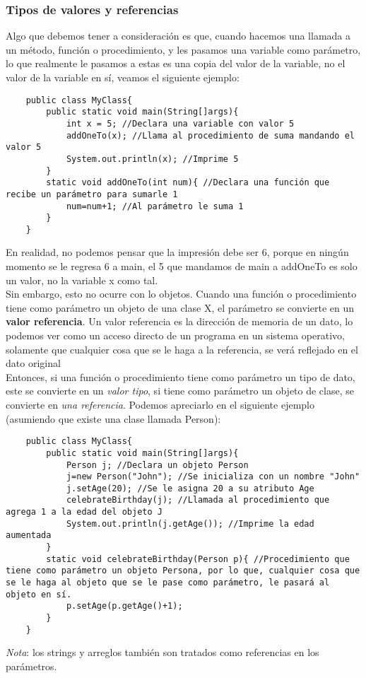 \subsubsection{Tipos de valores y referencias}
Algo que debemos tener a consideración es que, cuando hacemos una llamada a un método, función o procedimiento, y les pasamos una variable como parámetro, lo que realmente le pasamos a estas es una copia del valor de la variable, no el valor de la variable en sí, veamos el siguiente ejemplo:
\begin{lstlisting}
    public class MyClass{
        public static void main(String[]args){
            int x = 5; //Declara una variable con valor 5
            addOneTo(x); //Llama al procedimiento de suma mandando el valor 5
            System.out.println(x); //Imprime 5
        }
        static void addOneTo(int num){ //Declara una función que recibe un parámetro para sumarle 1
            num=num+1; //Al parámetro le suma 1
        }
    }
\end{lstlisting}
En realidad, no podemos pensar que la impresión debe ser 6, porque en ningún momento se le regresa 6 a main, el 5 que mandamos de main a addOneTo es solo un valor, no la variable x como tal.\\
Sin embargo, esto no ocurre con lo objetos. Cuando una función o procedimiento tiene como parámetro un objeto de una clase X, el parámetro se convierte en un \textbf{valor referencia}. Un valor referencia es la dirección de memoria de un dato, lo podemos ver como un acceso directo de un programa en un sistema operativo, solamente que cualquier cosa que se le haga a la referencia, se verá reflejado en el dato original\\
Entonces, si una función o procedimiento tiene como parámetro un tipo de dato, este se convierte en un \textit{valor tipo}, si tiene como parámetro un objeto de clase, se convierte en \textit{una referencia}. Podemos apreciarlo en el siguiente ejemplo (asumiendo que existe una clase llamada Person):
\begin{lstlisting}
    public class MyClass{
        public static void main(String[]args){
            Person j; //Declara un objeto Person
            j=new Person("John"); //Se inicializa con un nombre "John"
            j.setAge(20); //Se le asigna 20 a su atributo Age
            celebrateBirthday(j); //Llamada al procedimiento que agrega 1 a la edad del objeto J
            System.out.println(j.getAge()); //Imprime la edad aumentada
        }
        static void celebrateBirthday(Person p){ //Procedimiento que tiene como parámetro un objeto Persona, por lo que, cualquier cosa que se le haga al objeto que se le pase como parámetro, le pasará al objeto en sí.
            p.setAge(p.getAge()+1);
        }
    }
\end{lstlisting}
\textit{Nota}: los strings y arreglos también son tratados como referencias en los parámetros.

